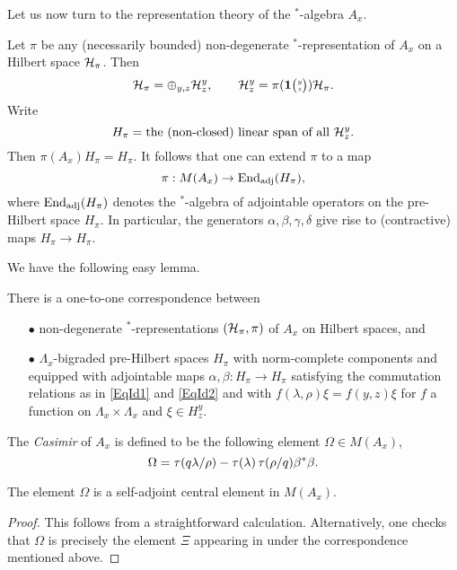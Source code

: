 Let us now turn to the representation theory of the $^*$-algebra $A_x$.

Let $\pi$ be any (necessarily bounded) non-degenerate $^*$-representation of $A_x$ on a Hilbert space $\mathcal{H}_{\pi}$. Then \[\mathcal{H}_{\pi} = \oplus_{y,z} \mathcal{H}^{y}_{z},\qquad \mathcal{H}^{y}_{z} = \pi(\mathbf{1}{\tiny {\begin{pmatrix} y\\z\end{pmatrix}}})\mathcal{H}_{\pi}.\] Write \[H_{\pi} =  \textrm{the (non-closed) linear span of all }\mathcal{H}^{y}_{z}.\] Then $\pi(A_x)H_{\pi} = H_{\pi}$. It follows that one can extend $\pi$ to a map \[\pi: M(A_x) \rightarrow \operatorname{\mathrm{End}}_{\operatorname{\mathrm{adj}}}(H_{\pi}),\] where $\operatorname{\mathrm{End}}_{\operatorname{\mathrm{adj}}}(H_{\pi})$ denotes the $^*$-algebra of adjointable operators on the pre-Hilbert space $H_{\pi}$. In particular, the generators $\alpha,\beta,\gamma,\delta$ give rise to (contractive) maps $H_{\pi}\rightarrow H_{\pi}$. 

We have the following easy lemma.

\begin{Lem} There is a one-to-one correspondence between\begin{itemize}\item[$\bullet$] non-degenerate $^*$-representations $(\mathcal{H}_{\pi},\pi)$ of $A_x$ on Hilbert spaces, and 
\item[$\bullet$] $\Lambda_x$-bigraded pre-Hilbert spaces $H_{\pi}$ with norm-complete components and equipped with adjointable maps $\alpha,\beta:H_{\pi}\rightarrow H_{\pi}$ satisfying the commutation relations as in \eqref{EqId1} and \eqref{EqId2} and with $f(\lambda,\rho)\xi = f(y,z)\xi$ for $f$ a function on $\Lambda_x\times \Lambda_x$ and $\xi\in H^y_z$.
\end{itemize}
\end{Lem}

\begin{Def} The \emph{Casimir} of $A_x$ is defined to be the following element $\Omega\in M(A_x)$, \[\Omega = \operatorname{\tau}(q\lambda/\rho) - \operatorname{\tau}(\lambda)\operatorname{\tau}(\rho/q)\beta^*\beta.\]  
\end{Def}

\begin{Lem} The element $\Omega$ is a self-adjoint central element in $M(A_x)$.
\end{Lem}
\begin{proof}
This follows from a straightforward calculation. Alternatively, one checks that $\Omega$ is precisely the element $\Xi$ appearing in \cite[Lemma 3.3]{KoR1} under the correspondence mentioned above. 
\end{proof}

